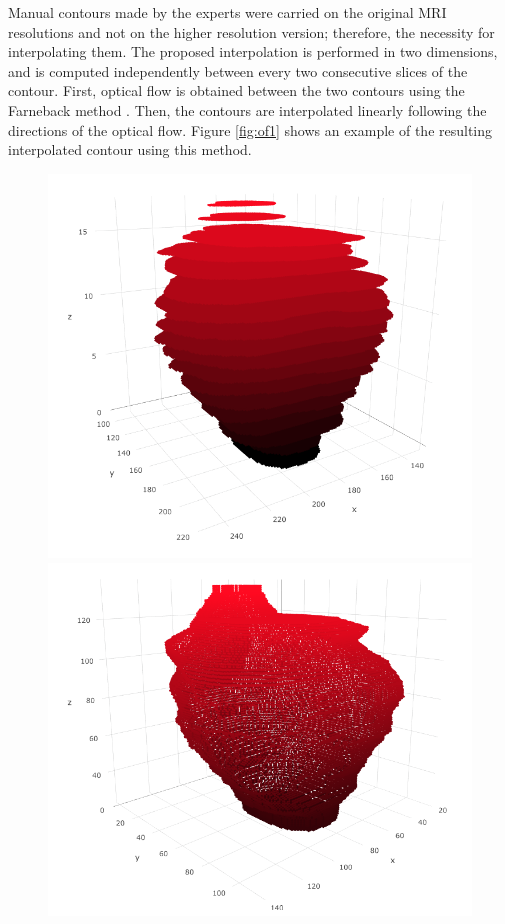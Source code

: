 Manual contours made by the experts were carried on the original MRI resolutions and not on the higher resolution version; therefore, the necessity for interpolating them.  The proposed interpolation is performed in two dimensions, and is computed independently between every two consecutive slices of the contour.  First, optical flow is obtained between the two contours using the  Farneback method \cite{optflow}. Then, the contours are interpolated linearly following the directions of the optical flow. Figure \ref{fig:of1} shows an example of the resulting interpolated contour using this method. 

\begin{figure}[h]
    \centering
    \includegraphics[totalheight=.15\textheight]{figures/methodology/OF_1.png}
    \includegraphics[totalheight=.15\textheight]{figures/methodology/OF_2.png}

\end{figure}
